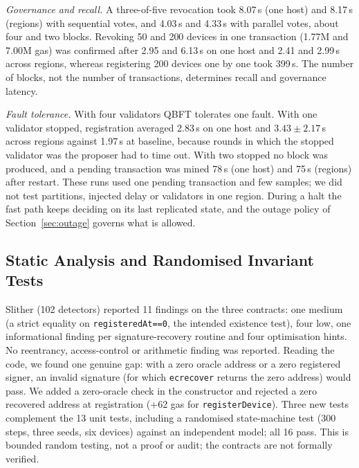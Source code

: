 \begin{table}[t]
\centering
\caption{Benchmark on one host versus four Google Cloud regions}
\label{tab:gcp}
\scriptsize
\setlength{\tabcolsep}{3pt}

\par\smallskip{}
\end{table}

\emph{Governance and recall.} A three-of-five revocation took 8.07\,s (one host) and 8.17\,s (regions) with sequential votes, and 4.03\,s and 4.33\,s with parallel votes, about four and two blocks. Revoking 50 and 200 devices in one transaction (1.77M and 7.00M gas) was confirmed after 2.95 and 6.13\,s on one host and 2.41 and 2.99\,s across regions, whereas registering 200 devices one by one took 399\,s. The number of blocks, not the number of transactions, determines recall and governance latency.

\emph{Fault tolerance.} With four validators QBFT tolerates one fault. With one validator stopped, registration averaged 2.83\,s on one host and $3.43\pm2.17$\,s across regions against 1.97\,s at baseline, because rounds in which the stopped validator was the proposer had to time out. With two stopped no block was produced, and a pending transaction was mined 78\,s (one host) and 75\,s (regions) after restart. These runs used one pending transaction and few samples; we did not test partitions, injected delay or validators in one region. During a halt the fast path keeps deciding on its last replicated state, and the outage policy of Section~\ref{sec:outage} governs what is allowed.

\subsection{Static Analysis and Randomised Invariant Tests}\label{sec:assure}
Slither (102 detectors) reported 11 findings on the three contracts: one medium (a strict equality on \texttt{registeredAt==0}, the intended existence test), four low, one informational finding per signature-recovery routine and four optimisation hints. No reentrancy, access-control or arithmetic finding was reported. Reading the code, we found one genuine gap: with a zero oracle address or a zero registered signer, an invalid signature (for which \texttt{ecrecover} returns the zero address) would pass. We added a zero-oracle check in the constructor and rejected a zero recovered address at registration (+62 gas for \texttt{registerDevice}). Three new tests complement the 13 unit tests, including a randomised state-machine test (300 steps, three seeds, six devices) against an independent model; all 16 pass. This is bounded random testing, not a proof or audit; the contracts are not formally verified.

